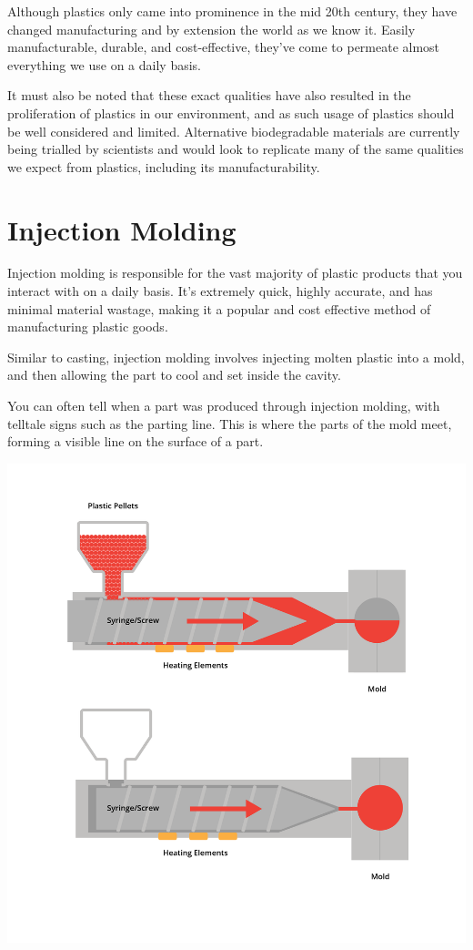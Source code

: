 Although plastics only came into prominence in the mid 20th century, they have changed manufacturing and by extension the world as we know it. Easily manufacturable, durable, and cost-effective, they’ve come to permeate almost everything we use on a daily basis.

It must also be noted that these exact qualities have also resulted in the proliferation of plastics in our environment, and as such usage of plastics should be well considered and limited. Alternative biodegradable materials are currently being trialled by scientists and would look to replicate many of the same qualities we expect from plastics, including its manufacturability.

\section{Injection Molding}

Injection molding is responsible for the vast majority of plastic products that you interact with on a daily basis. It’s extremely quick, highly accurate, and has minimal material wastage, making it a popular and cost effective method of manufacturing plastic goods.

Similar to casting, injection molding involves injecting molten plastic into a mold, and then allowing the part to cool and set inside the cavity. 

You can often tell when a part was produced through injection molding, with telltale signs such as the parting line. This is where the parts of the mold meet, forming a visible line on the surface of a part.

\includegraphics[width=.75\textwidth]{injectionMolding.png}


